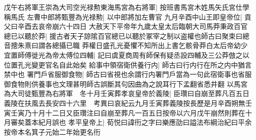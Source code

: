 戊午右將軍王崇為大司空光禄勲東海馬宮為右將軍|{
	按班書馬宮木姓馬矢氏宮仕學稱馬氏}
左曹中郎將甄豐為光禄勲|{
	以中郎將加左曹官}
九月辛酉中山王即皇帝位|{
	貢父曰辛酉去哀帝崩六十四日}
大赦天下平帝年九歲太皇太后臨朝大司馬莽秉政百官總已以聽於莽|{
	援古者天子諒隂百官總已以聽於冢宰之制以盗權也師古曰聚束曰總音摠朱熹曰謂各總攝已職}
莽權日盛孔光憂懼不知所出上書乞骸骨莽白太后帝幼少宜置師傅徙光為帝太傅位四輔|{
	記曰虞夏商周有師保有疑丞設四輔及三公莽倣之以位置孔光變更官名自此始矣}
給事中領宿衛供養行内|{
	師古曰行内行在所之内中猶言禁中也}
署門戶省服御食物|{
	師古曰省視也余謂行内署門戶當為一句此宿衛事也省服御食物則供養事也文理甚明師古誤斷其句因曲為之說耳行下孟翻省悉井翻}
以馬宮為大司徒甄豐為右將軍　冬十月壬寅葬孝哀皇帝於義陵|{
	臣瓚曰自崩至葬凡百五日義陵在扶風去長安四十六里　考異曰哀紀云九月壬寅葬義陵按長歷是月辛酉朔無壬寅壬寅乃十月十二日又臣瓚注曰自崩至葬凡一百五日按帝以六月戊午崩然則葬在十月審矣蓋本紀月誤也}
孝平皇帝上|{
	荀悦曰諱衎之字曰樂應劭曰謚法布綱治紀曰平余按帝本名箕子元始二年始更名衎}


